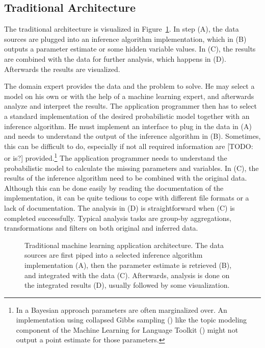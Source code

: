 \subsection{Traditional Architecture}

The traditional architecture is visualized in Figure~\ref{fig:ml-application-architecture}. In step (A), the data sources are plugged into an inference algorithm implementation, which in (B) outputs a parameter estimate or some hidden variable values. In (C), the results are combined with the data for further analysis, which happens in (D). Afterwards the results are visualized.

The domain expert provides the data and the problem to solve. He may select a model on his own or with the help of a machine learning expert, and afterwards analyze and interpret the results. The application programmer then has to select a standard implementation of the desired probabilistic model together with an inference algorithm. He must implement an interface to plug in the data in (A) and needs to understand the output of the inference algorithm in (B). Sometimes, this can be difficult to do, especially if not all required information are [TODO: or is?] provided.\footnote{In a Bayesian approach parameters are often marginalized over. An implementation using collapsed Gibbs sampling (\cite{liu1994collapsed}) like the topic modeling component of the Machine Learning for Language Toolkit (\cite{mccallum2002mallet}) might not output a point estimate for those parameters.} The application programmer needs to understand the probabilistic model to calculate the missing parameters and variables. In (C), the results of the inference algorithm need to be combined with the original data. Although this can be done easily by reading the documentation of the implementation, it can be quite tedious to cope with different file formats or a lack of documentation. The analysis in (D) is straightforward when (C) is completed successfully. Typical analysis tasks are group-by aggregations, transformations and filters on both original and inferred data.

\begin{figure}[t]
\centering
\scalebox{\tikzScale}{\adjustTikzSize }
\caption[Traditional machine learning application architecture]{Traditional machine learning application architecture. The data sources are first piped into a selected inference algorithm implementation (A), then the parameter estimate is retrieved (B), and integrated with the data (C). Afterwards, analysis is done on the integrated results (D), usually followed by some visualization.}\label{fig:ml-application-architecture}
\end{figure}

